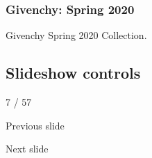 \hypertarget{givenchy-spring-2020-1}{%
\subsubsection{Givenchy: Spring 2020}\label{givenchy-spring-2020-1}}

Givenchy Spring 2020 Collection.

\hypertarget{slideshow-controls}{%
\subsection{Slideshow controls}\label{slideshow-controls}}

7 / 57

Previous slide

Next slide
